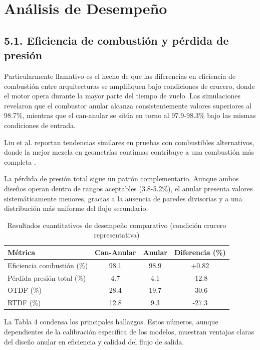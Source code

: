 \section{Análisis de Desempeño}

\subsection{5.1. Eficiencia de combustión y pérdida de presión}

Particularmente llamativo es el hecho de que las diferencias en eficiencia de combustión entre arquitecturas se amplifiquen bajo condiciones de crucero, donde el motor opera durante la mayor parte del tiempo de vuelo. Las simulaciones revelaron que el combustor anular alcanza consistentemente valores superiores al 98.7\%, mientras que el can-anular se sitúa en torno al 97.9-98.3\% bajo las mismas condiciones de entrada.

Liu et al. reportan tendencias similares en pruebas con combustibles alternativos, donde la mejor mezcla en geometrías continuas contribuye a una combustión más completa \cite{Liu2024}. 

La pérdida de presión total sigue un patrón complementario. Aunque ambos diseños operan dentro de rangos aceptables (3.8-5.2\%), el anular presenta valores sistemáticamente menores, gracias a la ausencia de paredes divisorias y a una distribución más uniforme del flujo secundario. 

\begin{table}[h]
\centering
\caption{Resultados cuantitativos de desempeño comparativo (condición crucero representativa)}
\label{tab:resultados_cuantitativos}
\begin{tabular}{lccc}
\hline
Métrica & Can-Anular & Anular & Diferencia (\%) \\
\hline
Eficiencia combustión (\%) & 98.1 & 98.9 & +0.82 \\
Pérdida presión total (\%) & 4.7 & 4.1 & -12.8 \\
OTDF (\%) & 28.4 & 19.7 & -30.6 \\
RTDF (\%) & 12.8 & 9.3 & -27.3 \\
\hline
\end{tabular}
\end{table}

La Tabla 4 condensa los principales hallazgos. Estos números, aunque dependientes de la calibración específica de los modelos, muestran ventajas claras del diseño anular en eficiencia y calidad del flujo de salida.

